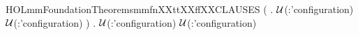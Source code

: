 \newcommand{\HOLmmFoundationTheoremsmmfnXXMONOTONICXXpropvar}{\UseVerbatim{HOLmmFoundationTheoremsmmfnXXMONOTONICXXpropvar}}
\begin{SaveVerbatim}{HOLmmFoundationTheoremsmmfnXXttXXffXXCLAUSES}
\HOLTokenTurnstile{} (\HOLSymConst{\HOLTokenForall{}}  .
         \ensuremath{\cal{U}}(:'configuration)  \HOLConst{\HOLTokenSubset{}}
         \ensuremath{\cal{U}}(:'configuration) ) \HOLSymConst{\HOLTokenConj{}}
   \HOLSymConst{\HOLTokenForall{}}  .
        \ensuremath{\cal{U}}(:'configuration)  \HOLConst{\HOLTokenSubset{}}
        \ensuremath{\cal{U}}(:'configuration) 
\end{SaveVerbatim}
\newcommand{\HOLmmFoundationTheoremsmmfnXXttXXffXXCLAUSES}{\UseVerbatim{HOLmmFoundationTheoremsmmfnXXttXXffXXCLAUSES}}
